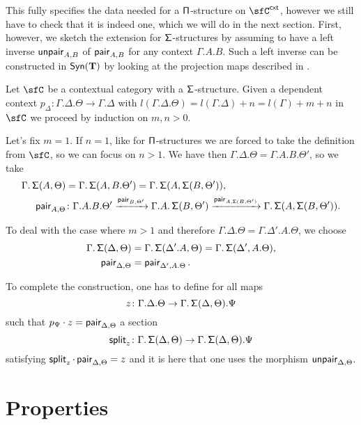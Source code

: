 This fully specifies the data needed for a $\operatorname{\mathsf{\Pi}}$-structure on $\sfC^{\cxt}$,
however we still have to check that it is indeed one, which we will do in the
next section. First, however, we sketch the extension for $\operatorname{\mathsf{\Sigma}}$-structures
by assuming to have a left inverse $\operatorname{\mathsf{unpair}}_{A,B}$
of $\operatorname{\mathsf{pair}}_{A,B}$ for any context $\Gamma.A.B$. Such a left inverse can be
constructed in $\mathsf{Syn}(\mathbf{T})$ by looking at the projection maps described in
\cite[Sec.\ 1.6]{Uni13}.

\begin{construction}
  Let $\sfC$ be a contextual category with a $\operatorname{\mathsf{\Sigma}}$-structure. Given a
  dependent context $p_\Delta\colon\Gamma.\Delta.\Theta\rightarrow\Gamma.\Delta$
  with $l(\Gamma.\Delta.\Theta)=l(\Gamma.\Delta)+n=l(\Gamma)+m+n$ in $\sfC$ we
  proceed by induction on $m,n>0$.

  Let's fix $m=1$. If $n=1$, like for $\operatorname{\mathsf{\Pi}}$-structures we are forced to take
  the definition from $\sfC$, so we can focus on $n>1$. We have then
  $\Gamma.\Delta.\Theta=\Gamma.A.B.\Theta'$, so we take
  \begin{align*}
    \Gamma.\operatorname{\mathsf{\Sigma}}(A,\Theta)
    &=\Gamma.\operatorname{\mathsf{\Sigma}}(A,B.\Theta')
    =\Gamma.\operatorname{\mathsf{\Sigma}}(A,\operatorname{\mathsf{\Sigma}}(B,\Theta')), \\
    \operatorname{\mathsf{pair}}_{A,\Theta}
    &\colon
    \Gamma.A.B.\Theta'
    \xrightarrow{\operatorname{\mathsf{pair}}_{B,\Theta'}}
    \Gamma.A.\operatorname{\mathsf{\Sigma}}(B,\Theta')
    \xrightarrow{\operatorname{\mathsf{pair}}_{A,\operatorname{\mathsf{\Sigma}}(B,\Theta')}}
    \Gamma.\operatorname{\mathsf{\Sigma}}(A,\operatorname{\mathsf{\Sigma}}(B,\Theta')).
  \end{align*}

  To deal with the case where $m>1$ and therefore
  $\Gamma.\Delta.\Theta=\Gamma.\Delta'.A.\Theta$, we choose
  \begin{align*}
    \Gamma.\operatorname{\mathsf{\Sigma}}(\Delta,\Theta)
    &=\Gamma.\operatorname{\mathsf{\Sigma}}(\Delta'.A,\Theta)
    =\Gamma.\operatorname{\mathsf{\Sigma}}(\Delta',A.\Theta), \\
    \operatorname{\mathsf{pair}}_{\Delta,\Theta}
    &=\operatorname{\mathsf{pair}}_{\Delta',A.\Theta}.
  \end{align*}

  To complete the construction, one has to define for all maps
  \[z\colon\Gamma.\Delta.\Theta\rightarrow\Gamma.\operatorname{\mathsf{\Sigma}}(\Delta,\Theta).\Psi\]
  such that $p_\Psi\cdot z=\operatorname{\mathsf{pair}}_{\Delta,\Theta}$ a section
  \[\operatorname{\mathsf{split}}_z\colon\Gamma.\operatorname{\mathsf{\Sigma}}(\Delta,\Theta)
  \rightarrow\Gamma.\operatorname{\mathsf{\Sigma}}(\Delta,\Theta).\Psi\]
  satisfying
  $\operatorname{\mathsf{split}}_z\cdot\operatorname{\mathsf{pair}}_{\Delta,\Theta}=z$ and it is here that one uses the
  morphism $\operatorname{\mathsf{unpair}}_{\Delta,\Theta}$.
\end{construction}

\section{Properties}

